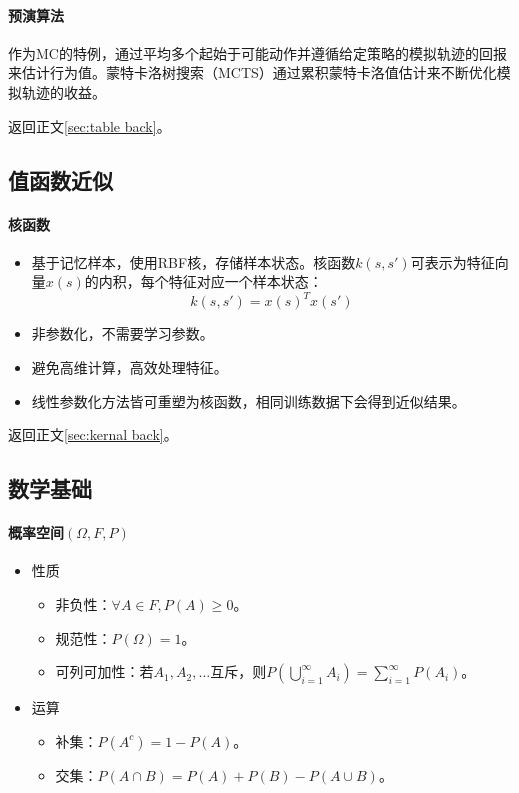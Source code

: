 \documentclass[
12pt, %
a4paper, 
oneside, %
headinclude,footinclude, %
]{scrartcl}
\begin{document}
\paragraph{预演算法}
作为MC的特例，通过平均多个起始于可能动作并遵循给定策略的模拟轨迹的回报来估计行为值。蒙特卡洛树搜索（MCTS）通过累积蒙特卡洛值估计来不断优化模拟轨迹的收益。

返回正文\ref{sec:table back}。
\subsection[值函数近似]{值函数近似}
\paragraph[核函数]{核函数}\label{sec:kernal}
\begin{itemize}
\item 基于记忆样本，使用RBF核，存储样本状态。核函数$ k(s, s') $可表示为特征向量$ x(s) $的内积，每个特征对应一个样本状态：
$$ k(s, s') = x(s)^T x(s') $$
\item 非参数化，不需要学习参数。
\item 避免高维计算，高效处理特征。
\item 线性参数化方法皆可重塑为核函数，相同训练数据下会得到近似结果。
\end{itemize}

返回正文\ref{sec:kernal back}。
\subsection[数学基础]{数学基础}
\paragraph{概率空间$ (\Omega, F, P) $}
\begin{itemize}
\item 性质
\begin{itemize}
\item 非负性：$ \forall A \in F, P(A) \geq 0 $。
\item 规范性：$ P(\Omega) = 1 $。
\item 可列可加性：若$ A_1, A_2, \dots $互斥，则$ P(\bigcup_{i = 1}^{\infty} A_i) = \sum_{i = 1}^{\infty} P(A_i) $。
\end{itemize}
\item 运算
\begin{itemize}
\item 补集：$ P(A^c) = 1 - P(A) $。
\item 交集：$ P(A \cap B) = P(A) + P(B) - P(A \cup B) $。
\end{itemize}
\end{itemize}
\end{document}
